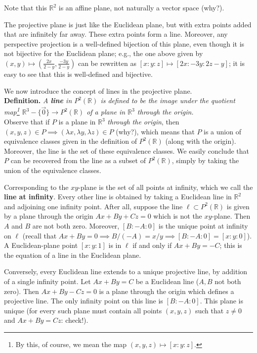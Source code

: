 \documentclass[leqno]{book}
\begin{document}
\noindent Note that this $\mathbb R^2$ is an affine plane, not naturally a vector space (why?).

The projective plane is just like the Euclidean plane, but with extra points added that are infinitely far away.  These extra points form a line.  Moreover, any perspective projection is a well-defined bijection of this plane, even though it is not bijective for the Euclidean plane; e.g., the one above given by $(x,y)\mapsto\left(\frac{2x}{2-y},\frac{-3y}{2-y}\right)$ can be rewritten as $[x:y:z]\mapsto[2x:-3y:2z-y]$; it is easy to see that this is well-defined and bijective.

We now introduce the concept of lines in the projective plane.\\

\noindent\textbf{Definition.} \emph{A \textbf{line} in $P^2(\mathbb R)$ is defined to be the image under the quotient map\footnote{By this, of course, we mean the map $(x,y,z)\mapsto[x:y:z]$.} $\mathbb R^3-\{\vec 0\}\to P^2(\mathbb R)$ of a plane in $\mathbb R^3$ through the origin.}\\

\noindent Observe that if $P$ is a plane in $\mathbb R^3$ \emph{through the origin}, then $(x,y,z)\in P\implies(\lambda x,\lambda y,\lambda z)\in P$ (why?), which means that $P$ is a union of equivalence classes given in the definition of $P^2(\mathbb R)$ (along with the origin).  Moreover, the line is the set of these equivalence classes.  We easily conclude that $P$ can be recovered from the line as a subset of $P^2(\mathbb R)$, simply by taking the union of the equivalence classes.

Corresponding to the $xy$-plane is the set of all points at infinity, which we call the \textbf{line at infinity}.  Every other line is obtained by taking a Euclidean line in $\mathbb R^2$ and adjoining one infinity point.  After all, suppose the line $\ell\subset P^2(\mathbb R)$ is given by a plane through the origin $Ax+By+Cz=0$ which is not the $xy$-plane.  Then $A$ and $B$ are not both zero.  Moreover, $[B:-A:0]$ is the unique point at infinity on $\ell$ (recall that $Ax+By=0\implies B/(-A)=x/y\implies[B:-A:0]=[x:y:0]$).  A Euclidean-plane point $[x:y:1]$ is in $\ell$ if and only if $Ax+By=-C$; this is the equation of a line in the Euclidean plane.

Conversely, every Euclidean line extends to a unique projective line, by addition of a single infinity point.  Let $Ax+By=C$ be a Euclidean line ($A,B$ not both zero).  Then $Ax+By-Cz=0$ is a plane through the origin which defines a projective line.  The only infinity point on this line is $[B:-A:0]$.  This plane is unique (for every such plane must contain all points $(x,y,z)$ such that $z\ne 0$ and $Ax+By=Cz$: check!).
\end{document}
